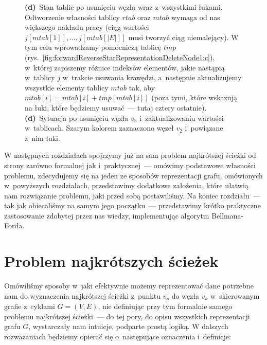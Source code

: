 \begin{figure}[!htbp]
{		\textbf{(d)}~Stan tablic po usunięciu węzła wraz z~wszystkimi łukami.
		Odtworzenie własności tablicy $rtab$ oraz $mtab$ wymaga od nas większego nakładu pracy (ciąg wartości $j \left[ mtab \left[ 1 \right] \right], \dots, j \left[ mtab \left[ \left| E \right| \right] \right]$ musi tworzyć ciąg niemalejący).
		W tym celu wprowadzamy pomocniczą tablicę $tmp$ (rys.~\ref{fig:forwardReverseStarRepresentationDeleteNode1:c}), w~której zapiszemy różnice indeksów elementów, jakie nastąpią w~tablicy $j$ w~trakcie usuwania krawędzi, a~następnie aktualizujemy wszystkie elementy tablicy $mtab$ tak, aby $mtab \left[i \right] = mtab \left[i \right] + tmp \left[ mtab \left[ i \right] \right]$ (poza tymi, które wskazują na łuki, które będziemy usuwać~--- tutaj cztery ostatnie).
		\textbf{(d)}~Sytuacja po usunięciu węzła $v_{5}$ i~zaktualizowaniu wartości w~tablicach.
		Szarym kolorem zaznaczono węzeł $v_{2}$ i~powiązane z~nim łuki.  
	}
	\label{fig:forwardReverseStarRepresentationDeleteNode1}
\end{figure}

W następnych rozdziałach spojrzymy już na sam problem najkrótszej ścieżki od strony zarówno formalnej jak i~praktycznej~--- omówimy podstawowe własności problemu, zdecydujemy się na jeden ze sposobów reprezentacji grafu, omówionych w~powyższych rozdziałach, przedstawimy dodatkowe założenia, które ułatwią nam rozwiązanie problemu, jaki przed sobą postawiliśmy.
Na koniec rozdziału~--- tak jak obiecaliśmy na samym jego początku~--- przedstawimy krótko praktyczne zastosowanie zdobytej przez nas wiedzy, implementując algorytm Bellmana-Forda.




\section{Problem najkrótszych ścieżek}
\label{sec:shortestPathProblem}




Omówiliśmy sposoby w~jaki efektywnie możemy reprezentować dane potrzebne nam do wyznaczenia najkrótszej ścieżki z~punktu $v_{p}$ do węzła $v_{k}$ w~skierowanym grafie z~cyklami $G = \left( V, E \right)$, nie definiując przy tym formalnie samego problemu najkrótszej ścieżki~--- do tej pory, do opisu wszystkich reprezentacji grafu $G$, wystarczały nam intuicje, podparte prostą logiką.
W dalszych rozważaniach będziemy opierać się o~następujące oznaczenia i~definicje:

